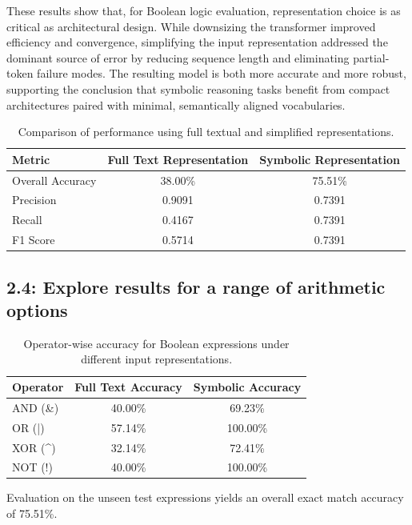 These results show that, for Boolean logic evaluation, representation choice is as critical as architectural design. While downsizing the transformer improved efficiency and convergence, simplifying the input representation addressed the dominant source of error by reducing sequence length and eliminating partial-token failure modes. The resulting model is both more accurate and more robust, supporting the conclusion that symbolic reasoning tasks benefit from compact architectures paired with minimal, semantically aligned vocabularies.

\begin{table}[h]
\centering
\begin{tabular}{lcc}
\hline
\textbf{Metric} & \textbf{Full Text Representation} & \textbf{Symbolic Representation} \\
\hline
Overall Accuracy & 38.00\% & 75.51\% \\
Precision & 0.9091 & 0.7391 \\
Recall & 0.4167 & 0.7391 \\
F1 Score & 0.5714 & 0.7391 \\
\hline
\end{tabular}
\caption{Comparison of performance using full textual and simplified representations.}
\label{tab:bool_results}
\end{table}



\subsection{2.4: Explore results for a range of arithmetic options}

\begin{table}[h]
\centering
\begin{tabular}{lcc}
\hline
\textbf{Operator} & \textbf{Full Text Accuracy} & \textbf{Symbolic Accuracy} \\
\hline
AND (\&) & 40.00\% & 69.23\% \\
OR (|) & 57.14\% & 100.00\% \\
XOR (\textasciicircum) & 32.14\% & 72.41\% \\
NOT (!) & 40.00\% & 100.00\% \\
\hline
\end{tabular}
\caption{Operator-wise accuracy for Boolean expressions under different input representations.}
\end{table}


Evaluation on the unseen test expressions yields an overall exact match accuracy of 75.51\%.

